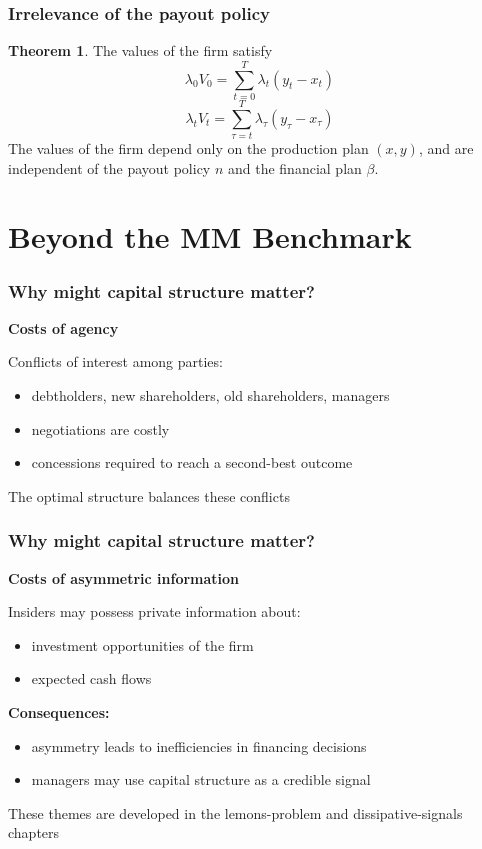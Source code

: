 \documentclass[blue]{beamer}
\theoremstyle{definition}
\theoremstyle{example}
\newtheorem*{theoremns}{Theorem}
\begin{document}
\begin{frame}\frametitle{Irrelevance of the payout policy}
\begin{theoremns}
The values of the firm satisfy
\begin{equation*}
\lambda_0 V_0 = \sum_{t=0}^T \lambda_t (y_t - x_t)
\end{equation*}
\begin{equation*}
\lambda_t V_t = \sum_{\tau = t}^T \lambda_\tau (y_\tau - x_\tau)
\end{equation*}
The values of the firm depend only on the production plan $(x, y)$, and are independent of the payout policy $n$ and the financial plan $\beta$.
\end{theoremns}
\end{frame}

\section{Beyond the MM Benchmark}

\begin{frame}\frametitle{Why might capital structure matter?}
\textbf{Costs of agency}
\bigskip

Conflicts of interest among parties:
\begin{itemize}
\item debtholders, new shareholders, old shareholders, managers
\item negotiations are costly
\item concessions required to reach a second-best outcome
\end{itemize}
\bigskip

The optimal structure balances these conflicts
\end{frame}

\begin{frame}\frametitle{Why might capital structure matter?}
\textbf{Costs of asymmetric information}
\bigskip

Insiders may possess private information about:
\begin{itemize}
\item investment opportunities of the firm
\item expected cash flows
\end{itemize}
\bigskip

\textbf{Consequences:}
\begin{itemize}
\item asymmetry leads to inefficiencies in financing decisions
\item managers may use capital structure as a credible signal
\end{itemize}
\bigskip

These themes are developed in the lemons-problem and dissipative-signals chapters
\end{frame}
\end{document}
